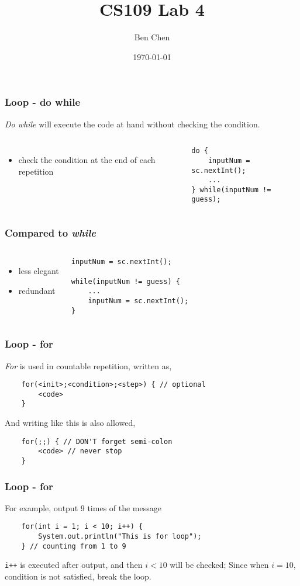 \documentclass{beamer}
\title{CS109 Lab 4}
\author{Ben Chen}
\institute{SUSTech}
\date{\today}
\begin{document}
\frame{\titlepage}

\begin{frame}[fragile]
    \frametitle{Loop - do while}
\textit{Do while} will execute the code at hand without checking the condition.
\newline
\newline
\begin{columns}
    \begin{itemize}
        \item check the condition at the end of each repetition
    \end{itemize}
    \begin{lstlisting}
do {
    inputNum = sc.nextInt();
    ...
} while(inputNum != guess);
    \end{lstlisting}
\end{columns}
\end{frame}

\begin{frame}[fragile]
    \frametitle{Compared to \textit{while}}
\begin{columns}
    \begin{itemize}
        \item less elegant
        \item redundant
    \end{itemize}
    \begin{lstlisting}
inputNum = sc.nextInt();

while(inputNum != guess) {
    ...
    inputNum = sc.nextInt();
}
    \end{lstlisting}
\end{columns}
\end{frame}

\begin{frame}[fragile]
    \frametitle{Loop - for}
\textit{For} is used in countable repetition, written as, 
\begin{lstlisting}
    for(<init>;<condition>;<step>) { // optional
        <code>
    }
\end{lstlisting}

And writing like this is also allowed,
\begin{lstlisting}
    for(;;) { // DON'T forget semi-colon
        <code> // never stop
    }
\end{lstlisting}
\end{frame}

\begin{frame}[fragile]
    \frametitle{Loop - for}
For example, output 9 times of the message
\begin{lstlisting}
    for(int i = 1; i < 10; i++) {
        System.out.println("This is for loop");
    } // counting from 1 to 9
\end{lstlisting}

\verb|i++| is executed after output, and then $i < 10$ will be checked;
\newline
\newline
Since when $i = 10$, condition is not satisfied, break the loop.
\end{frame}
\end{document}
